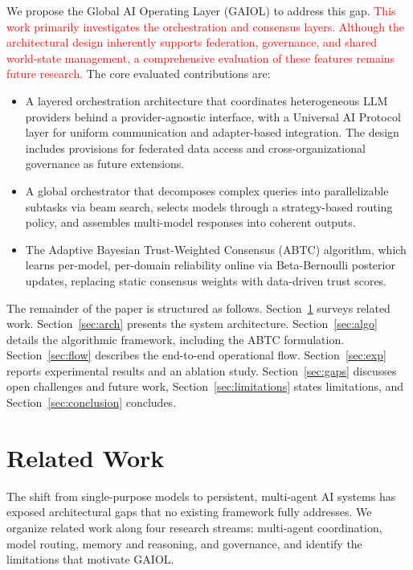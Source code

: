 \documentclass{iopjournal}
\newcommand{\rev}[1]{\textcolor{red}{#1}}
\begin{document}
We propose the Global AI Operating Layer (GAIOL) to address this gap. \rev{This work primarily investigates the orchestration and consensus layers. Although the architectural design inherently supports federation, governance, and shared world-state management, a comprehensive evaluation of these features remains future research.} The core evaluated contributions are: 
\begin{itemize}
    \item A layered orchestration architecture that coordinates heterogeneous LLM providers behind a provider-agnostic interface, with a Universal AI Protocol layer for uniform communication and adapter-based integration. The design includes provisions for federated data access and cross-organizational governance as future extensions.
    \item A global orchestrator that decomposes complex queries into parallelizable subtasks via beam search, selects models through a strategy-based routing policy, and assembles multi-model responses into coherent outputs.
    \item The Adaptive Bayesian Trust-Weighted Consensus (ABTC) algorithm, which learns per-model, per-domain reliability online via Beta-Bernoulli posterior updates, replacing static consensus weights with data-driven trust scores.
\end{itemize}

The remainder of the paper is structured as follows. Section~\ref{sec:lit} surveys related work. Section~\ref{sec:arch} presents the system architecture. Section~\ref{sec:algo} details the algorithmic framework, including the ABTC formulation. Section~\ref{sec:flow} describes the end-to-end operational flow. Section~\ref{sec:exp} reports experimental results and an ablation study. Section~\ref{sec:gaps} discusses open challenges and future work, Section~\ref{sec:limitations} states limitations, and Section~\ref{sec:conclusion} concludes.

\section{Related Work}
\label{sec:lit}
The shift from single-purpose models to persistent, multi-agent AI systems has exposed architectural gaps that no existing framework fully addresses. We organize related work along four research streams: multi-agent coordination, model routing, memory and reasoning, and governance, and identify the limitations that motivate GAIOL.
\end{document}
